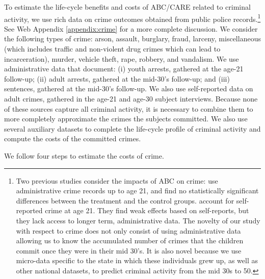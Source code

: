 To estimate the life-cycle benefits and costs of ABC/CARE related to criminal activity, we use rich data on crime outcomes obtained from public police records.\footnote{Two previous studies consider the impacts of ABC on crime: \citet{Clarke_Campbell_1998_ABC_Comparison_ECRQ} use administrative crime records up to age 21, and find no statistically significant differences between the treatment and the control groups. \cite{Barnett_Masse_2002_benefitcost,Barnett_Masse_2007_EER} account for self-reported crime at age 21. They find weak effects based on self-reports, but they lack access to longer term, administrative data. The novelty of our study with respect to crime does not only consist of using administrative data allowing us to know the accumulated number of crimes that the children commit once they were in their mid 30's. It is also novel because we use micro-data specific to the state in which these individuals grew up, as well as other national datasets, to predict criminal activity from the mid 30s to 50.} See Web Appendix \ref{appendix:crime} for a more complete discussion. We consider the following types of crime: arson, assault, burglary, fraud, larceny, miscellaneous (which includes traffic and non-violent drug crimes which can lead to incarceration), murder, vehicle theft, rape, robbery, and vandalism. We use administrative data that document: (i) youth arrests, gathered at the age-21 follow-up; (ii) adult arrests, gathered at the mid-30's follow-up; and (iii) sentences, gathered at the mid-30's follow-up. We also use self-reported data on adult crimes, gathered in the age-21 and age-30 subject interviews. Because none of these sources capture all criminal activity, it is necessary to combine them to more completely approximate the crimes the subjects committed. We also use several auxiliary datasets to complete the life-cycle profile of criminal activity and compute the costs of the committed crimes.

We follow four steps to estimate the costs of crime.

